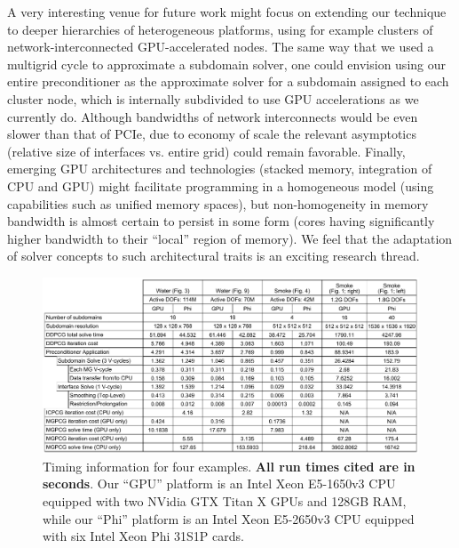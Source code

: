 A very interesting venue for future work might focus on extending our technique to deeper hierarchies of heterogeneous platforms, using for example clusters of
network-interconnected GPU-accelerated nodes. The same way that we used a multigrid cycle to approximate a subdomain solver, one could envision using our entire
preconditioner as the approximate solver for a subdomain assigned to each cluster node, which is internally subdivided to use GPU accelerations as we currently
do. Although bandwidths of network interconnects would be even slower than that of PCIe, due to economy of scale the relevant asymptotics (relative size of
interfaces vs. entire grid) could remain favorable. Finally, emerging GPU architectures and technologies (stacked memory, integration of CPU and GPU) might
facilitate programming in a homogeneous model (using capabilities such as unified memory spaces), but non-homogeneity in memory bandwidth is almost certain to
persist in some form (cores having significantly higher bandwidth to their ``local'' region of memory). We feel that the adaptation of solver concepts to such
architectural traits is an exciting research thread.

\begin{figure}[t]
\begin{center}
\includegraphics[width=.94\textwidth]{images/DD/performance_results.pdf}
\end{center}
\caption{Timing information for four examples. \textbf{All run times cited are in seconds}. Our ``GPU'' platform is an Intel Xeon
E5-1650v3 CPU equipped with two NVidia GTX Titan X GPUs and 128GB RAM, while our ``Phi'' platform is an Intel Xeon E5-2650v3 CPU equipped with six Intel Xeon Phi 31S1P cards.
}
\label{fig:performance-results}
\end{figure}

